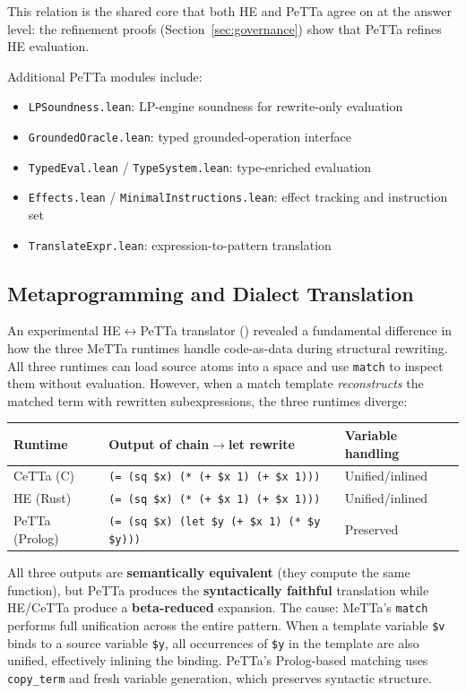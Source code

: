 \documentclass[11pt]{article}
\newcommand{\code}[1]{\texttt{#1}}
\newcommand{\codepath}[1]{\path{#1}}
\begin{document}
This relation is the shared core that both HE and PeTTa agree on at the
answer level: the refinement proofs (Section~\ref{sec:governance}) show
that PeTTa refines HE evaluation.

Additional PeTTa modules include:
\begin{itemize}
\item \code{LPSoundness.lean}: LP-engine soundness for rewrite-only evaluation
\item \code{GroundedOracle.lean}: typed grounded-operation interface
\item \code{TypedEval.lean} / \code{TypeSystem.lean}: type-enriched evaluation
\item \code{Effects.lean} / \code{MinimalInstructions.lean}: effect tracking and instruction set
\item \code{TranslateExpr.lean}: expression-to-pattern translation
\end{itemize}

\subsection{Metaprogramming and Dialect Translation}
\label{sec:metaprog}

An experimental HE$\leftrightarrow$PeTTa translator
(\codepath{hyperon/translators/}) revealed a fundamental difference in
how the three MeTTa runtimes handle code-as-data during structural
rewriting.  All three runtimes can load source atoms into a space and
use \code{match} to inspect them without evaluation.  However, when a
match template \emph{reconstructs} the matched term with rewritten
subexpressions, the three runtimes diverge:

\begin{center}
\begin{tabular}{lll}
\toprule
Runtime & Output of chain$\to$let rewrite & Variable handling \\
\midrule
CeTTa (C) & \code{(= (sq \$x) (* (+ \$x 1) (+ \$x 1)))} & Unified/inlined \\
HE (Rust) & \code{(= (sq \$x) (* (+ \$x 1) (+ \$x 1)))} & Unified/inlined \\
PeTTa (Prolog) & \code{(= (sq \$x) (let \$y (+ \$x 1) (* \$y \$y)))} & Preserved \\
\bottomrule
\end{tabular}
\end{center}

All three outputs are \textbf{semantically equivalent} (they compute the
same function), but PeTTa produces the \textbf{syntactically faithful}
translation while HE/CeTTa produce a \textbf{beta-reduced} expansion.
The cause: MeTTa's \code{match} performs full unification across the
entire pattern.  When a template variable \code{\$v} binds to a source
variable \code{\$y}, all occurrences of \code{\$y} in the template are
also unified, effectively inlining the binding.  PeTTa's Prolog-based
matching uses \code{copy\_term} and fresh variable generation, which
preserves syntactic structure.
\end{document}
